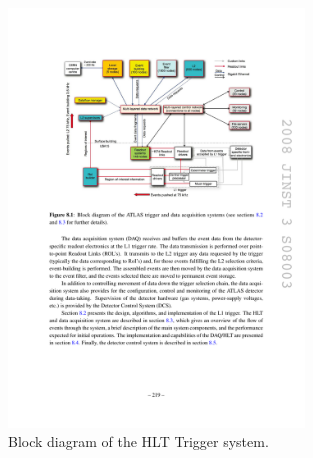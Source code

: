 \begin{figure}[ht]
	\centering
        \includegraphics[width=0.7\textwidth]{figures/setup/HLT_Trigger}
          \caption{Block diagram of the HLT Trigger system.}
          \label{fig:HLT_trigger}
\end{figure}








%



